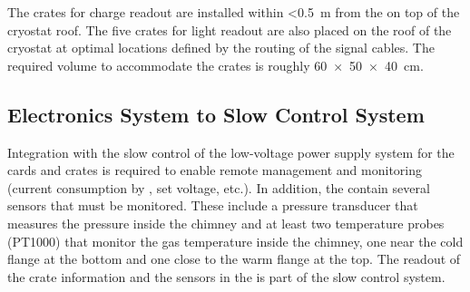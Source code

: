 The  crates for charge readout are installed within \SI{<0.5}{\meter} from the  on top of the cryostat roof. The five  crates for light readout are also placed on the roof of the cryostat at optimal locations defined by the routing of the  signal cables. The required volume to accommodate the crates is roughly \SI[product-units=power]{60x50x40}{\cm}. 

\subsection{Electronics System to Slow Control System}
\label{ssec:dp-tpcelec-intfc-sc}

Integration with the slow control of the low-voltage power supply system for the  cards and  crates is required to enable remote management and monitoring (current consumption by , set voltage, etc.).  In addition, the  contain several sensors that must be monitored. These include a pressure transducer that measures the pressure inside the chimney and at least two temperature probes (PT1000) that monitor the gas temperature inside the chimney, one near the cold flange at the bottom and one close to the warm flange at the top. The readout of the  crate information and the sensors in the  is part of the slow control system.
